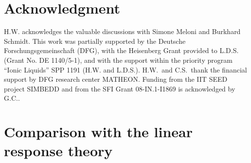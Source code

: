 \documentclass[a4paper,preprint,unsortedaddress,onecolumn]{revtex4-1}
\begin{document}
\section*{Acknowledgment}
  H.W. acknowledges the valuable discussions with Simone Meloni and Burkhard Schmidt.
  This work was partially supported by the Deutsche
  Forschungsgemeinschaft (DFG), with the Heisenberg
  Grant provided to L.D.S. (Grant No. DE 1140/5-1),
  and with the support within the priority program ``Ionic Liquids'' SPP 1191
  (H.W. and L.D.S.). 
  H.W.~and C.S.~thank the financial support by DFG research center MATHEON.
  Funding from the IIT SEED project SIMBEDD and from the SFI Grant 08-IN.1-I1869 is acknowledged by G.C..

  \appendix
\section{Comparison with the linear response theory}  
\end{document}
